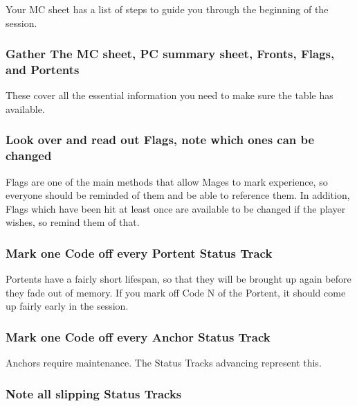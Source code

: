 \documentclass[
  oneside,
  statementpaper,
  9pt]{memoir}
\begin{document}
Your MC sheet has a list of steps to guide you through the beginning of
the session.

\hypertarget{gather-the-mc-sheet-pc-summary-sheet-fronts-flags-and-portents}{%
\subsubsection{Gather The MC sheet, PC summary sheet, Fronts, Flags, and
Portents}\label{gather-the-mc-sheet-pc-summary-sheet-fronts-flags-and-portents}}

These cover all the essential information you need to make sure the
table has available.

\hypertarget{look-over-and-read-out-flags-note-which-ones-can-be-changed}{%
\subsubsection{Look over and read out Flags, note which ones can be
changed}\label{look-over-and-read-out-flags-note-which-ones-can-be-changed}}

Flags are one of the main methods that allow Mages to mark experience,
so everyone should be reminded of them and be able to reference them. In
addition, Flags which have been hit at least once are available to be
changed if the player wishes, so remind them of that.

\hypertarget{mark-one-code-off-every-portent-status-track}{%
\subsubsection{Mark one Code off every Portent Status
Track}\label{mark-one-code-off-every-portent-status-track}}

Portents have a fairly short lifespan, so that they will be brought up
again before they fade out of memory. If you mark off Code N of the
Portent, it should come up fairly early in the session.

\hypertarget{mark-one-code-off-every-anchor-status-track}{%
\subsubsection{Mark one Code off every Anchor Status
Track}\label{mark-one-code-off-every-anchor-status-track}}

Anchors require maintenance. The Status Tracks advancing represent this.

\hypertarget{note-all-slipping-status-tracks}{%
\subsubsection{Note all slipping Status
Tracks}\label{note-all-slipping-status-tracks}}
\end{document}
